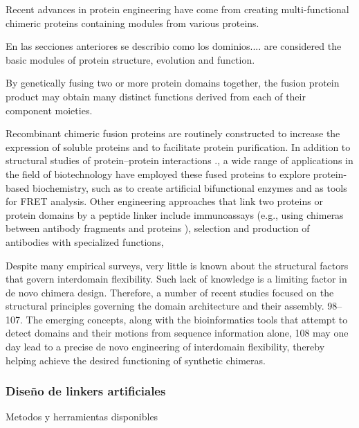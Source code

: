 Recent advances in protein engineering have come from creating multi-functional chimeric proteins containing modules from various proteins.

En las secciones anteriores se describio como los dominios.... are considered the basic modules of protein structure, evolution and function.

By genetically fusing two or more protein domains together, the fusion protein product may obtain many distinct functions derived from each of their component moieties.


Recombinant chimeric fusion proteins are routinely constructed to increase the expression of soluble proteins and to facilitate protein purification.
In addition to structural studies of protein–protein interactions \cite{reddy2013linkers}., a wide range of applications in the field of biotechnology have employed these fused proteins
to explore protein-based biochemistry, such as to create artificial bifunctional enzymes and as tools for FRET analysis.
Other engineering approaches that link two proteins or protein domains by a peptide linker include immunoassays (e.g., using chimeras between antibody fragments and proteins ),  selection and production of antibodies with specialized functions, 




Despite many empirical surveys, very little is known about the structural factors that govern interdomain flexibility. 
Such lack of knowledge is a limiting factor in de novo chimera design. Therefore, a number of recent studies focused on the structural principles governing the domain architecture and their assembly. 98–107. The emerging concepts, along
with the bioinformatics tools that attempt to detect domains and their motions from sequence information alone, 108 may one day lead to a precise de novo engineering of interdomain flexibility, thereby helping
achieve the desired functioning of synthetic chimeras.
  

  
\subsubsection{Diseño de linkers artificiales}
Metodos y herramientas disponibles



